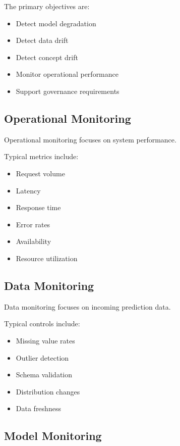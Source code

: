 The primary objectives are:

\begin{itemize}
    \item Detect model degradation
    \item Detect data drift
    \item Detect concept drift
    \item Monitor operational performance
    \item Support governance requirements
\end{itemize}

\subsection{Operational Monitoring}

Operational monitoring focuses on system performance.

Typical metrics include:

\begin{itemize}
    \item Request volume
    \item Latency
    \item Response time
    \item Error rates
    \item Availability
    \item Resource utilization
\end{itemize}

\subsection{Data Monitoring}

Data monitoring focuses on incoming prediction data.

Typical controls include:

\begin{itemize}
    \item Missing value rates
    \item Outlier detection
    \item Schema validation
    \item Distribution changes
    \item Data freshness
\end{itemize}

\subsection{Model Monitoring}

